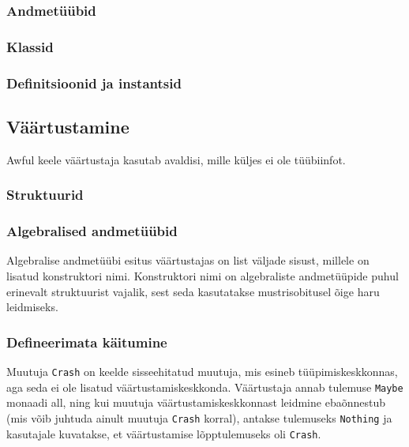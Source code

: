 \documentclass[12pt]{article}
\begin{document}
      \subsubsection{Andmetüübid}
        
      \subsubsection{Klassid}
        
      \subsubsection{Definitsioonid ja instantsid}
        
    \subsection{Väärtustamine}
      Awful keele väärtustaja kasutab avaldisi, mille küljes ei ole tüübiinfot.
\begin{comment}
    Add_Int_expression_2 |
    Add_Int'_expression_2 Integer |
    Algebraic_expression_2 String [Expression_2] |
    Application_expression_2 Expression_2 Expression_2 |
    Field_expression_2 String |
    Function_expression_2 Pattern_0 Expression_2 |
    Match_expression_2 Expression_2 Matches_2 |
    Struct_expression_2 (Map' Expression_2) |
\end{comment}
      \subsubsection{Struktuurid}
        
      \subsubsection{Algebralised andmetüübid}
        Algebralise andmetüübi esitus väärtustajas on list väljade sisust, millele on lisatud konstruktori nimi. Konstruktori nimi on algebraliste andmetüüpide puhul erinevalt struktuurist vajalik, sest seda kasutatakse mustrisobitusel õige haru leidmiseks.
      \subsubsection{Defineerimata käitumine}
        Muutuja \verb!Crash! on keelde sisseehitatud muutuja, mis esineb tüüpimiskeskkonnas, aga seda ei ole lisatud väärtustamiskeskkonda. Väärtustaja annab tulemuse \verb!Maybe! monaadi all, ning kui muutuja väärtustamiskeskkonnast leidmine ebaõnnestub (mis võib juhtuda ainult muutuja \verb!Crash! korral), antakse tulemuseks \verb!Nothing! ja kasutajale kuvatakse, et väärtustamise lõpptulemuseks oli \verb!Crash!.
\end{document}
